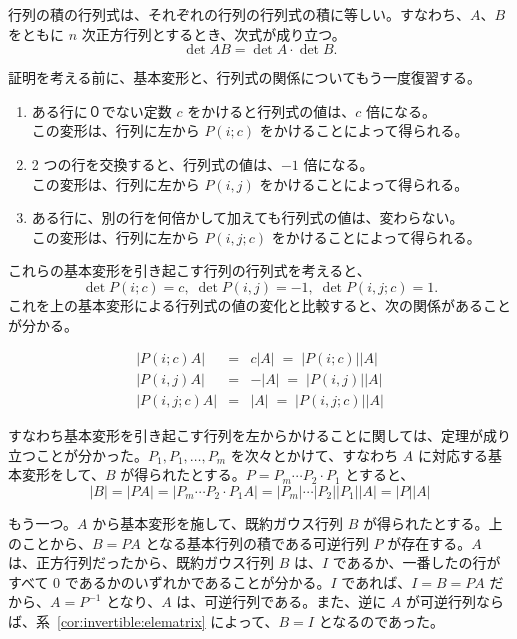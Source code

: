 \begin{thm} \label{thm:detofprod}
行列の積の行列式は、それぞれの行列の行列式の積に等しい。すなわち、$A$、$B$ をともに $n$ 次正方行列とするとき、次式が成り立つ。
$$\det AB = \det A\cdot \det B.$$
\end{thm}

証明を考える前に、基本変形と、行列式の関係についてもう一度復習する。
\begin{enumerate}
\item ある行に０でない定数 $c$ をかけると行列式の値は、$c$ 倍になる。\\
この変形は、行列に左から $P(i;c)$ をかけることによって得られる。
\item 2 つの行を交換すると、行列式の値は、$-1$ 倍になる。\\
この変形は、行列に左から $P(i,j)$ をかけることによって得られる。
\item ある行に、別の行を何倍かして加えても行列式の値は、変わらない。\\
この変形は、行列に左から $P(i,j;c)$ をかけることによって得られる。
\end{enumerate}

これらの基本変形を引き起こす行列の行列式を考えると、
$$\det P(i;c) = c,\;\det P(i,j) = -1,\; \det P(i,j;c) = 1.$$
これを上の基本変形による行列式の値の変化と比較すると、次の関係があることが分かる。

\begin{eqnarray*}
|P(i;c)A| & = & c|A| \; = \; |P(i;c)||A|\\
|P(i,j)A| & = & -|A| \; = \; |P(i,j)||A|\\
|P(i,j;c)A| & = & |A| \; = \; |P(i,j;c)||A|
\end{eqnarray*}

すなわち基本変形を引き起こす行列を左からかけることに関しては、定理が成り立つことが分かった。$P_1,P_1,\ldots, P_m$ を次々とかけて、すなわち $A$ に対応する基本変形をして、$B$ が得られたとする。$P = P_m\cdots P_2\cdot P_1$ とすると、
$$|B| = |PA| = |P_m\cdots P_2\cdot P_1A| = |P_m|\cdots|P_2||P_1||A| = |P||A|$$

\smallskip
もう一つ。$A$ から基本変形を施して、既約ガウス行列 $B$ が得られたとする。上のことから、$B = PA$ となる基本行列の積である可逆行列 $P$ が存在する。$A$ は、正方行列だったから、既約ガウス行列 $B$ は、$I$ であるか、一番したの行がすべて 0 であるかのいずれかであることが分かる。$I$ であれば、$I = B = PA$ だから、$A = P^{-1}$ となり、$A$ は、可逆行列である。また、逆に $A$ が可逆行列ならば、系~\ref{cor:invertible:elematrix} によって、$B = I$ となるのであった。

